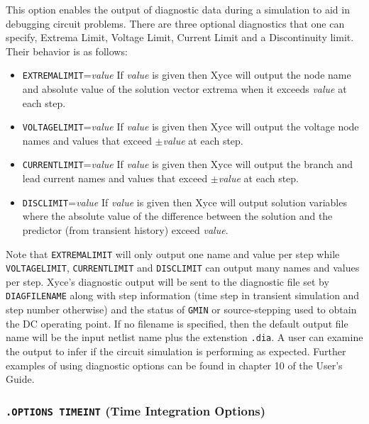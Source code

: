 This option enables the output of diagnostic data during a simulation to aid
in debugging circuit problems.  There are three optional diagnostics that one 
can specify, Extrema Limit, Voltage Limit, Current Limit and a Discontinuity
limit.  Their behavior is as follows:
\begin{itemize}
  \item \texttt{EXTREMALIMIT}={\em value}  If {\em value} is given then Xyce will output 
  the node name and absolute value of the solution vector extrema  when it exceeds 
  {\em value} at each step.
  \item \texttt{VOLTAGELIMIT}={\em value} If {\em value} is given then Xyce will output
  the voltage node names and values that exceed {\em $\pm$value} at each step.
  \item \texttt{CURRENTLIMIT}={\em value} If {\em value} is given then Xyce will output
  the branch and lead current names and values that exceed {\em $\pm$value} at each step.
  \item \texttt{DISCLIMIT}={\em value} If {\em value} is given then Xyce will output
  solution variables where the absolute value of the difference between the solution
  and the predictor (from transient history) exceed {\em value}.
\end{itemize}

Note that \texttt{EXTREMALIMIT} will only output one name and value per step while
\texttt{VOLTAGELIMIT}, \texttt{CURRENTLIMIT} and \texttt{DISCLIMIT} can output many 
names and values per step.  Xyce's diagnostic output will be sent to the diagnostic 
file set by \texttt{DIAGFILENAME} along with step information (time step in transient 
simulation and step number otherwise) and the status of \texttt{GMIN} or source-stepping 
used to obtain the DC operating point. If no filename is specified, then the 
default output file name will be the input netlist name plus the extenstion \texttt{.dia}.
A user can examine the output to infer if the circuit simulation is performing as expected.
Further examples of using diagnostic options can be found in chapter 10 of the \Xyce{} 
User's Guide.




\subsubsection{\texttt{.OPTIONS TIMEINT} (Time Integration Options)}

